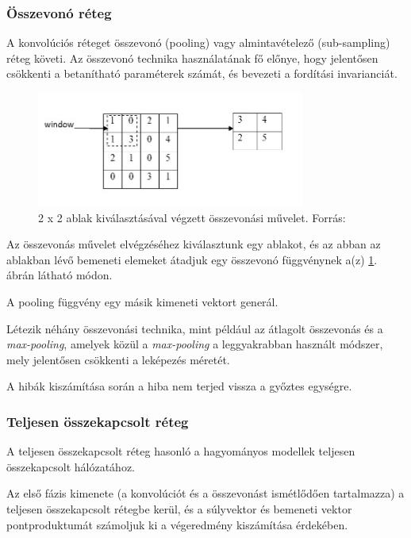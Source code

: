 \documentclass[12pt,a4]{article}
\begin{document}
	\subsubsection{Összevonó réteg}

	A konvolúciós réteget összevonó (pooling) vagy 
	almintavételező (sub-sampling) \cite{CNN} réteg követi.
	Az összevonó technika használatának fő előnye, hogy 
	jelentősen csökkenti a betanítható paraméterek számát,
	és bevezeti a fordítási invarianciát. 

    \begin{figure}[h]	
		\centering
		\includegraphics[width=0.5\linewidth]{pooling-op.jpg}
		\caption{2 x 2 ablak kiválasztásával végzett összevonási művelet. Forrás: \cite{CNN}}
        \label{fig:pooling}
	\end{figure}
 
	Az összevonás művelet elvégzéséhez kiválasztunk egy ablakot,
	és az abban az ablakban lévő bemeneti elemeket átadjuk
	egy összevonó függvénynek a(z) \ref{fig:pooling}. ábrán látható módon.
	
	\newpage
	
	A pooling függvény egy másik kimeneti vektort generál.
	
	Létezik néhány összevonási technika, mint például az átlagolt összevonás 
	és a \textit{max-pooling}, amelyek közül a \textit{max-pooling} a leggyakrabban használt módszer,
	mely jelentősen csökkenti a leképezés méretét.
	
	A hibák kiszámítása során a hiba nem terjed vissza a győztes egységre.
	
	\subsubsection{Teljesen összekapcsolt réteg}
	
	A teljesen összekapcsolt réteg \cite{CNN} hasonló a hagyományos modellek teljesen összekapcsolt hálózatához.
	
	Az első
	fázis kimenete (a konvolúciót és a összevonást ismétlődően tartalmazza) a teljesen összekapcsolt rétegbe kerül, és a súlyvektor és bemeneti vektor pontproduktumát számoljuk ki a végeredmény kiszámítása érdekében.
	
\end{document}
